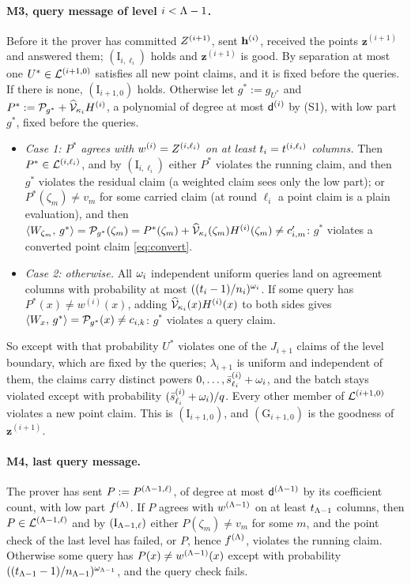 \paragraph{M3, query message of level $i<\Lambda-1$.} Before it the prover has committed $Z^{(i+1)}$, sent $\mathbf{h}^{(i)}$, received the points $\mathbf z^{(i+1)}$ and answered them; $(\mathrm I_{i,\ell_i})$ holds and $\mathbf z^{(i+1)}$ is good. By separation at most one $U^\ast\in\mathcal{L}^{(i+1,0)}$ satisfies all new point claims, and it is fixed before the queries. If there is none, $(\mathrm I_{i+1,0})$ holds. Otherwise let $g^\ast:=g_{U^\ast}$ and $P^\ast:=\mathcal{P}_{g^\ast}+\widehat{\mathcal{V}}_{\kappa_i}H^{(i)}$, a polynomial of degree at most $\mathsf{d}^{(i)}$ by (S1), with low part $g^\ast$, fixed before the queries.
\begin{itemize}[itemsep=1pt,topsep=2pt]
\item \emph{Case 1: $P^\ast$ agrees with $w^{(i)}=Z^{(i,\ell_i)}$ on at least $t_i=t^{(i,\ell_i)}$ columns.} Then $P^\ast\in\mathcal{L}^{(i,\ell_i)}$, and by $(\mathrm I_{i,\ell_i})$ either $P^\ast$ violates the running claim, and then $g^\ast$ violates the residual claim (a weighted claim sees only the low part); or $P^\ast(\zeta_m)\ne v_m$ for some carried claim (at round $\ell_i$ a point claim is a plain evaluation), and then $\langle W_{\zeta_m},\, g^\ast \rangle=\mathcal{P}_{g^\ast}(\zeta_m)=P^\ast(\zeta_m)+\widehat{\mathcal{V}}_{\kappa_i}(\zeta_m)H^{(i)}(\zeta_m)\ne c'_{i,m}$: $g^\ast$ violates a converted point claim \eqref{eq:convert}.
\item \emph{Case 2: otherwise.} All $\omega_i$ independent uniform queries land on agreement columns with probability at most $((t_i-1)/n_i)^{\omega_i}$. If some query has $P^\ast(x)\ne w^{(i)}(x)$, adding $\widehat{\mathcal{V}}_{\kappa_i}(x)H^{(i)}(x)$ to both sides gives $\langle W_x,\, g^\ast \rangle=\mathcal{P}_{g^\ast}(x)\ne c_{i,k}$: $g^\ast$ violates a query claim.
\end{itemize}
So except with that probability $U^\ast$ violates one of the $J_{i+1}$ claims of the level boundary, which are fixed by the queries; $\lambda_{i+1}$ is uniform and independent of them, the claims carry distinct powers $0,\dots,\bar s^{(i)}_{\ell_i}+\omega_i$, and the batch stays violated except with probability $(\bar s^{(i)}_{\ell_i}+\omega_i)/q$. Every other member of $\mathcal{L}^{(i+1,0)}$ violates a new point claim. This is $(\mathrm I_{i+1,0})$, and $(\mathrm G_{i+1,0})$ is the goodness of $\mathbf z^{(i+1)}$.

\paragraph{M4, last query message.} The prover has sent $P:=P^{(\Lambda-1,\ell)}$, of degree at most $\mathsf{d}^{(\Lambda-1)}$ by its coefficient count, with low part $f^{(\Lambda)}$. If $P$ agrees with $w^{(\Lambda-1)}$ on at least $t_{\Lambda-1}$ columns, then $P\in\mathcal{L}^{(\Lambda-1,\ell)}$ and by $(\mathrm I_{\Lambda-1,\ell})$ either $P(\zeta_m)\ne v_m$ for some $m$, and the point check of the last level has failed, or $P$, hence $f^{(\Lambda)}$, violates the running claim. Otherwise some query has $P(x)\ne w^{(\Lambda-1)}(x)$ except with probability $((t_{\Lambda-1}-1)/n_{\Lambda-1})^{\omega_{\Lambda-1}}$, and the query check fails.

